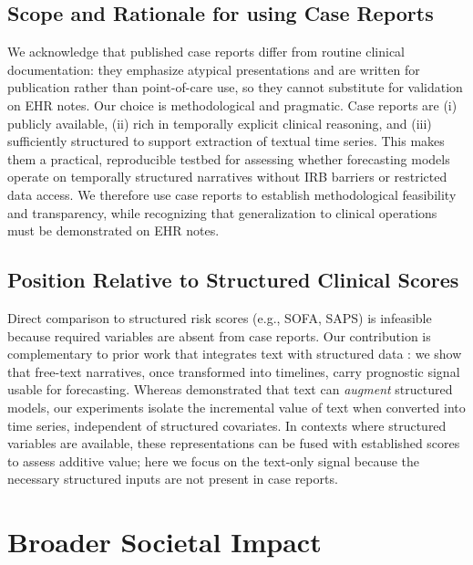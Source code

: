 \subsection{Scope and Rationale for using Case Reports}
We acknowledge that published case reports differ from routine clinical documentation: they emphasize atypical presentations and are written for publication rather than point-of-care use, so they cannot substitute for validation on EHR notes. Our choice is methodological and pragmatic. Case reports are (i) publicly available, (ii) rich in temporally explicit clinical reasoning, and (iii) sufficiently structured to support extraction of textual time series. This makes them a practical, reproducible testbed for assessing whether forecasting models operate on temporally structured narratives without IRB barriers or restricted data access. We therefore use case reports to establish methodological feasibility and transparency, while recognizing that generalization to clinical operations must be demonstrated on EHR notes.

\subsection{Position Relative to Structured Clinical Scores}
Direct comparison to structured risk scores (e.g., SOFA, SAPS) is infeasible because required variables are absent from case reports. Our contribution is complementary to prior work that integrates text with structured data \citep{kline2022multimodal,wang2025large}: we show that free-text narratives, once transformed into timelines, carry prognostic signal usable for forecasting. Whereas \citet{kline2022multimodal} demonstrated that text can \emph{augment} structured models, our experiments isolate the incremental value of text when converted into time series, independent of structured covariates. In contexts where structured variables are available, these representations can be fused with established scores to assess additive value; here we focus on the text-only signal because the necessary structured inputs are not present in case reports.

\newpage
\section{Broader Societal Impact}
\label{apd:broader_impact}


